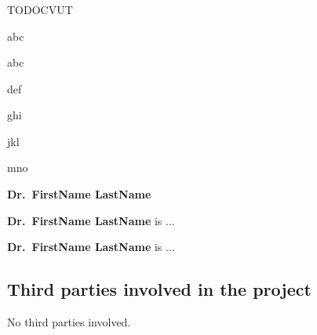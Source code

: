 \subsubsection{\PRAGUE}

TODOCVUT

abc

\begin{keypubs}{\PRAGUE}
\item
abc
\item
def
\item
ghi
\item
jkl
\item
mno
\end{keypubs}

 {\bf Dr.~FirstName LastName} 

\textbf{Dr.~FirstName LastName} is ...

\textbf{Dr.~FirstName LastName} is ...



\subsection{Third parties involved in the project}
\label{sec:thirdparties}
%


No third parties involved.


